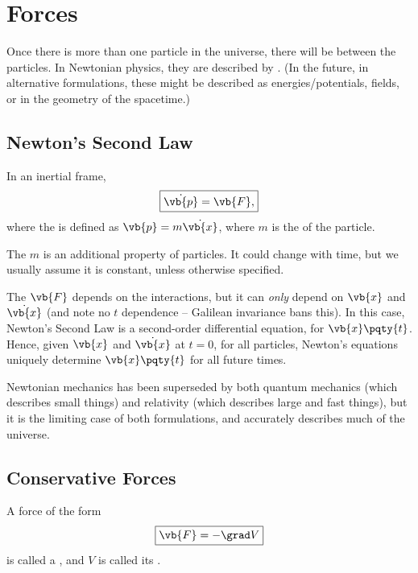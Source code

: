 \section{Forces}

Once there is more than one particle in the universe, there will be  between the particles. In Newtonian physics, they are described by . (In the future, in alternative formulations, these might be described as energies/potentials, fields, or in the geometry of the spacetime.)

\subsection{Newton's Second Law}

\begin{theorem}
    \label{thm:newton-2}%
    In an inertial frame,
    \begin{equation}
        \boxed{\dot{\vb{p}} = \vb{F},}
    \end{equation}
    where the  is defined as \(\vb{p} = m \dot{\vb{x}}\), where \(m\) is the  of the particle.
\end{theorem}

The  \(m\) is an additional property of particles. It could change with time, but we usually assume it is constant, unless otherwise specified.

The  \(\vb{F}\) depends on the interactions, but it can \emph{only} depend on \(\vb{x}\) and \(\dot{\vb{x}}\) (and note no \(t\) dependence -- Galilean invariance bans this). In this case, Newton's Second Law is a second-order differential equation, for \(\vb{x} \pqty{t}\). Hence, given \(\vb{x}\) and \(\dot{\vb{x}}\) at \(t = 0\), for all particles, Newton's equations uniquely determine \(\vb{x}\pqty{t}\) for all future times.

Newtonian mechanics has been superseded by both quantum mechanics (which describes small things) and relativity (which describes large and fast things), but it is the limiting case of both formulations, and accurately describes much of the universe.

\subsection{Conservative Forces}

\begin{definition}
    \label{def:conservative-forces-potentials}%
    A force of the form
    \begin{equation}
        \boxed{\vb{F} = - \grad V}
    \end{equation}
    is called a , and \(V\) is called its .
\end{definition}

